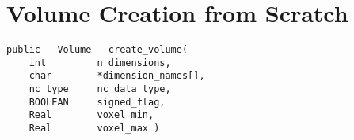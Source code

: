 
\section{Volume Creation from Scratch}

{\bf\begin{verbatim}
public   Volume   create_volume(
    int         n_dimensions,
    char        *dimension_names[],
    nc_type     nc_data_type,
    BOOLEAN     signed_flag,
    Real        voxel_min,
    Real        voxel_max )
\end{verbatim}}

\desc{}



